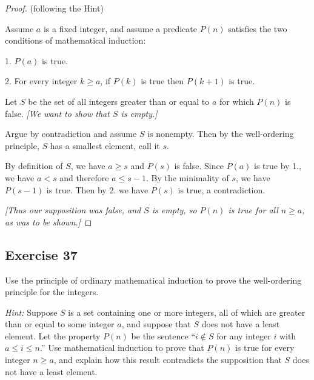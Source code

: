 \documentclass[14pt]{extarticle}
\begin{document}
\begin{proof}
(following the Hint)

Assume $a$ is a fixed integer, and assume a predicate $P(n)$ satisfies the two conditions of mathematical induction:

1. $P(a)$ is true.

2. For every integer $k \geq a$, if $P(k)$ is true then $P(k+1)$ is true.

Let $S$ be the set of all integers greater than or equal to $a$ for which $P(n)$ is false. 
{\it [We want to show that $S$ is empty.]}

Argue by contradiction and assume $S$ is nonempty.
Then by the well-ordering principle, $S$ has a smallest element, call it $s$.

By definition of $S$, we have $a \geq s$ and $P(s)$ is false. Since $P(a)$ is true by 1., we have $a < s$ and 
therefore $a \leq s-1$.
By the minimality of $s$, we have $P(s-1)$ is true.
Then by 2. we have $P(s)$ is true, a contradiction.

{\it [Thus our supposition was false, and $S$ is empty, so $P(n)$ is true for all $n \geq a$, as was to be shown.]}
\end{proof}

\subsection{Exercise 37}
Use the principle of ordinary mathematical induction to prove the well-ordering principle for the integers.

{\it Hint:} Suppose $S$ is a set containing one or more integers, all of which are greater than or equal to some  
integer $a$, and suppose that $S$ does not have a least element. Let the property $P(n)$ be the sentence 
``$i \notin S$ for any integer $i$ with $a \leq i \leq n$.'' Use mathematical induction to prove that $P(n)$ is 
true for every integer $n \geq a$, and explain how this result contradicts the supposition that 
$S$ does not have a least element.
\end{document}
